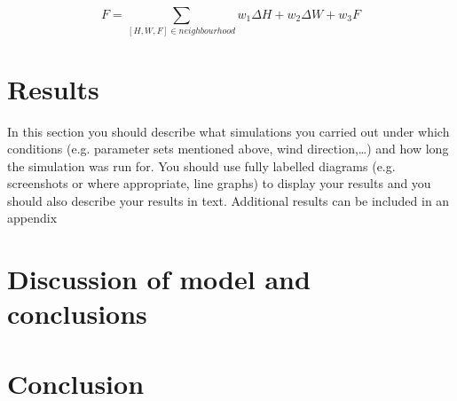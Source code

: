 \documentclass[11pt, a4paper, titlepage]{article}
\begin{document}
\[ F = \sum_{ [H, W, F] \in neighbourhood  } w_1 \Delta H + w_2 \Delta W + w_3 F  \]

\section{Results}
\begin{displayquote}
  In this section you should describe what simulations you
carried out under which conditions (e.g. parameter sets mentioned above, wind direction,…) and
how long the simulation was run for. You should use fully labelled diagrams (e.g. screenshots or
where appropriate, line graphs) to display your results and you should also describe your results in
text. Additional results can be included in an appendix
\end{displayquote}

\newpage
\section{Discussion of model and conclusions} 
\section{Conclusion}

\newpage
\renewcommand{\bibname}{Bibliography}


\end{document}
